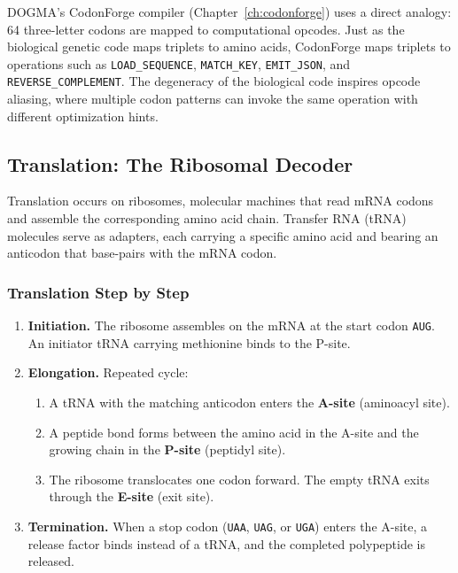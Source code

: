 \begin{implnote}
DOGMA's CodonForge compiler (Chapter~\ref{ch:codonforge}) uses a direct analogy: 64 three-letter codons are mapped to computational opcodes. Just as the biological genetic code maps triplets to amino acids, CodonForge maps triplets to operations such as \texttt{LOAD\_SEQUENCE}, \texttt{MATCH\_KEY}, \texttt{EMIT\_JSON}, and \texttt{REVERSE\_COMPLEMENT}. The degeneracy of the biological code inspires opcode aliasing, where multiple codon patterns can invoke the same operation with different optimization hints.
\end{implnote}

\subsection{Translation: The Ribosomal Decoder}
\label{subsec:translation}

Translation occurs on ribosomes, molecular machines that read mRNA codons and assemble the corresponding amino acid chain. Transfer RNA (tRNA) molecules serve as adapters, each carrying a specific amino acid and bearing an anticodon that base-pairs with the mRNA codon.

\subsubsection{Translation Step by Step}

\begin{enumerate}[leftmargin=1.8em]
  \item \textbf{Initiation.} The ribosome assembles on the mRNA at the start codon \texttt{AUG}. An initiator tRNA carrying methionine binds to the P-site.

  \item \textbf{Elongation.} Repeated cycle:
  \begin{enumerate}[label=(\roman*)]
    \item A tRNA with the matching anticodon enters the \textbf{A-site} (aminoacyl site).
    \item A peptide bond forms between the amino acid in the A-site and the growing chain in the \textbf{P-site} (peptidyl site).
    \item The ribosome translocates one codon forward. The empty tRNA exits through the \textbf{E-site} (exit site).
  \end{enumerate}

  \item \textbf{Termination.} When a stop codon (\texttt{UAA}, \texttt{UAG}, or \texttt{UGA}) enters the A-site, a release factor binds instead of a tRNA, and the completed polypeptide is released.
\end{enumerate}

